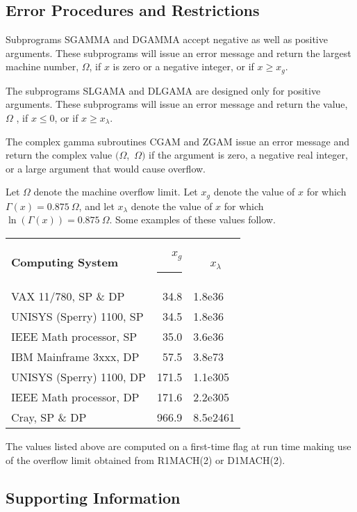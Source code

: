 \documentclass[twoside]{MATH77}
\begin{document}



\subsection{Error Procedures and Restrictions}

Subprograms SGAMMA and DGAMMA accept negative as well as positive arguments.
These subprograms will issue an error message and return the largest machine
number, $\Omega $, if $x$ is zero or a negative integer, or if $x \geq x_g.$

The subprograms SLGAMA and DLGAMA are designed only for positive arguments.
These subprograms will issue an error message and return the value, $\Omega $%
, if $x \leq 0$, or if $x \geq x_\lambda .$

The complex gamma subroutines CGAM and ZGAM issue an error message and
return the complex value $(\Omega $,\ $\Omega )$ if the argument is zero, a
negative real integer, or a large argument that would cause overflow.

Let $\Omega $ denote the machine overflow limit. Let $x_g$ denote the value
of $x$ for which $\Gamma (x) = 0.875\ \Omega $, and let $x_\lambda $ denote
the value of $x$ for which $\ln (\Gamma (x)) = 0.875\ \Omega $. Some
examples of these values follow.

\begin{center}
\begin{tabular}{lrl}
{\bf Computing System}&{\bf $x_g $}\rule{3pt}{0pt}&\ \ \ {\bf $x_\lambda $}\\
VAX 11/780, SP \& DP & 34.8 & 1.8e36\\
UNISYS (Sperry) 1100, SP & 34.5 & 1.8e36\\
IEEE Math processor, SP & 35.0 & 3.6e36\\
IBM Mainframe 3xxx, DP & 57.5 & 3.8e73\\
UNISYS (Sperry) 1100, DP & 171.5 & 1.1e305\\
IEEE Math processor, DP & 171.6 & 2.2e305\\
Cray, SP \& DP & 966.9 & 8.5e2461
\end{tabular}
\end{center}

The values listed above are computed on a first-time flag at run time making
use of the overflow limit obtained from R1MACH(2) or D1MACH(2).

\subsection{Supporting Information}
\end{document}
